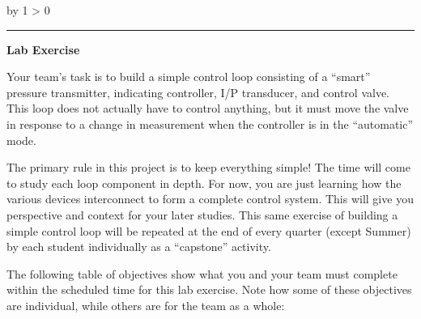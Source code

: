 \documentclass[12pt,a4paper]{article}
\def\oppgave{
            \advance\questnum by 1
            \ifnum \questnum > 0
                 \hrule
                 \vskip 3pt
                 \leftline{Oppgave \the\questnum}
                 \vskip 3pt \fi}
\begin{document}
\begin{itemize}

\vfil \eject 



\oppgave{} 

\noindent
{\bf Lab Exercise} 

\vskip 5pt

Your team's task is to build a simple control loop consisting of a ``smart'' pressure transmitter, indicating controller, I/P transducer, and control valve.  This loop does not actually have to control anything, but it must move the valve in response to a change in measurement when the controller is in the ``automatic'' mode.  

The primary rule in this project is to keep everything simple!  The time will come to study each loop component in depth.  For now, you are just learning how the various devices interconnect to form a complete control system.  This will give you perspective and context for your later studies.  This same exercise of building a simple control loop will be repeated at the end of every quarter (except Summer) by each student individually as a ``capstone'' activity.


The following table of objectives show what you and your team must complete within the scheduled time for this lab exercise.  Note how some of these objectives are individual, while others are for the team as a whole:

\vskip 10pt




\end{itemize}
\end{document}
